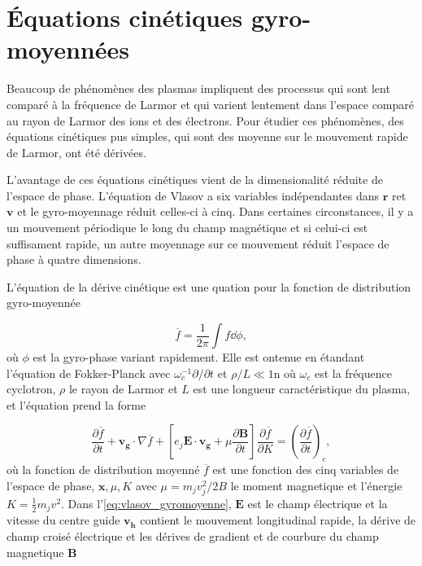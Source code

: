 \documentclass[main.tex]{subfiles}
\begin{document}
\section{Équations cinétiques gyro-moyennées}

Beaucoup de phénomènes des plasmas impliquent des processus qui sont lent comparé à la fréquence de Larmor et qui varient lentement dans l'espace comparé au rayon de Larmor des ions et des électrons.
Pour étudier ces phénomènes, des équations cinétiques pus simples, qui sont des moyenne sur le mouvement rapide de Larmor, ont été dérivées.

L'avantage de ces équations cinétiques vient de la dimensionalité réduite de l'espace de phase.
L'équation de Vlasov a six variables indépendantes dans \( \bm{r} \) ret \( \bm{v} \) et le gyro-moyennage réduit celles-ci à cinq.
Dans certaines circonstances, il y a un mouvement périodique le long du champ magnétique et si celui-ci est suffisament rapide, un autre moyennage sur ce mouvement réduit l'espace de phase à quatre dimensions.

L'équation de la dérive cinétique est une quation pour la fonction de distribution gyro-moyennée

\[
	\overline{f} = \frac{1}{2\pi} \int f \dd \phi,
\]
où \( \phi \) est la gyro-phase variant rapidement.
Elle est ontenue en étandant l'équation de Fokker-Planck avec \( \omega_c^{-1}\partial/\partial t \) et \( \rho/L \ll 1 \)n où \( \omega_c \) est la fréquence cyclotron, \( \rho \) le rayon de Larmor et \( L \) est une longueur caractéristique du plasma, et l'équation prend la forme

\begin{equation}
	\frac{\partial \overline{f}}{\partial t} + \bm{v_g} \cdot \nabla \overline{f} + \left[ e_j \bm{E} \cdot \bm{v_g} + \mu \frac{\partial \bm{B}}{\partial t} \right] \frac{\partial \overline{f}}{\partial K} = \left( \frac{\partial \overline{f}}{\partial t} \right)_c,
	\label{eq:vlasov_gyromoyenne}
\end{equation}
où la fonction de distribution moyenné \( \overline{f} \) est une fonction des cinq variables de l'espace de phase, \( \bm{x}, \mu, K \) avec \( \mu = m_j v_j^2 / 2 B \) le moment magnetique et l'énergie \( K = \frac{1}{2} m_j v^2 \).
Dans l'\autoref{eq:vlasov_gyromoyenne}, \( \bm{E} \) est le champ électrique et la vitesse du centre guide \( \bm{v_h} \) contient le mouvement longitudinal rapide, la dérive de champ croisé électrique  et les dérives de gradient et de courbure du champ magnetique \( \bm{B} \)
\end{document}
